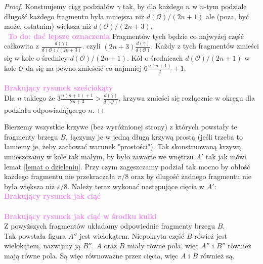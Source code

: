\documentclass[a4paper, 12pt]{article}
\newtheorem{lemma}[observation]{Lemma}
\newcommand{\smalltodoII}[1]{\hfill \break \textbf{\ \textcolor{violet}{To do: #1}}\hfill \break}
\newcommand{\rysunek}[1]{\hfill \break\\[16pt] \Huge \textbf{\textcolor{violet}{Brakujący rysunek \normalsize
#1}} \hfill
\break \\[16pt] \normalsize}
\begin{document}
\begin{proof}
    Konstuujemy ciąg podziałów $\gamma$
     tak, by dla każdego $n$ w $n$-tym podziale
     długość każdego fragmentu była mniejsza niż $d(\mathcal{O})/(2n+1)$ ale (poza, być może, ostatnim)
      większa niż $d(\mathcal{O})/(2n+3)$. \\
      \smalltodoII{dać lepsze oznaczenia}
     Fragmentów tych będzie co najwyżej część całkowita z $\frac{d(\gamma)}{d(\mathcal{O})/(2n+3)}$.
     czyli $(2n+3)\frac{d(\gamma)}{d(\mathcal{O})}$. Każdy z tych fragmentów zmieści się w kole
     o średnicy $d(\mathcal{O})/(2n+1)$. Kół o średnicach $d(\mathcal{O})/(2n+1)$ w kole $\mathcal{O}$ da się
      na pewno zmieścić co najmniej $6\frac{n(n+1)}{2}+1$. \\
      \rysunek{sześciokąty}
      Dla $n$ takiego że $3\frac{n(n+1)+1}{2n+3}>\frac{d(\gamma)}{d(\mathcal{O})}$, krzywa zmieści się
      rozłącznie w okręgu dla podziału odpowiadającego $n$.
\end{proof}

Bierzemy wszystkie krzywe (bez wyróżnionej strony) z których powstały te fragmenty brzegu $B$, łączymy je
w jedną długą krzywą prostą (jeśli trzeba to łamiemy je, żeby zachować warunek "prostości").
Tak skonstruowaną krzywą umieszczamy w kole tak małym, by było zawarte we wnętrzu $A'$ tak jak mówi lemat
\ref{lemat o dzieleniu}. Przy czym zagęszczamy podział tak mocno by obłość każdego fragmentu nie
przekraczała $\pi/8$ oraz by dlugość żadnego fragmentu nie była większa niż $\varepsilon/8$.
Należy teraz wykonać następujące cięcia w $A'$:
\rysunek{jak ciąć}
\rysunek{jak ciąć w środku kulki}
Z powyższych fragmentów układamy odpowiednie fragmenty brzegu $B$. \\
Tak powstała figura $A''$ jest wielokątem. Niepokryta część $B$ rówież jest wielokątem,
nazwijmy ją $B''$. $A$ oraz $B$ miały równe pola, więc $A''$ i $B''$ również mają równe pola.
Są więc równoważne przez cięcia, więc $A$ i $B$ również są. \\[8pt]
\end{document}
